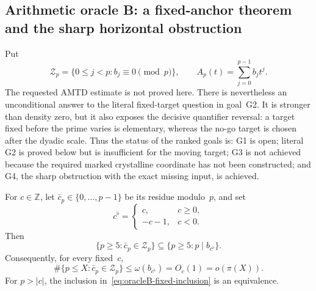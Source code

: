 
\subsection{Arithmetic oracle B: a fixed-anchor theorem and the sharp
horizontal obstruction}
\label{ssec:oracleB-result}

Put
\[
 \mathcal Z_p=\{0\leq j<p:b_j\equiv0\pmod p\},
 \qquad A_p(t)=\sum_{j=0}^{p-1}b_jt^j.
\]
The requested AMTD estimate is not proved here.  There is nevertheless an
unconditional answer to the literal fixed-target question in goal~G2.  It is
stronger than density zero, but it also exposes the decisive quantifier
reversal: a target fixed before the prime varies is elementary, whereas the
no-go target is chosen after the dyadic scale.
Thus the status of the ranked goals is: G1 is open; literal G2 is proved
below but is insufficient for the moving target; G3 is not achieved because
the required marked crystalline coordinate has not been constructed; and G4,
the sharp obstruction with the exact missing input, is achieved.

\begin{proposition}
\label{prop:oracleB-fixed-anchor}
For $c\in\mathbb Z$, let $\bar c_p\in\{0,\ldots,p-1\}$ be its residue
modulo~$p$, and set
\[
 c^\flat=\begin{cases}
 c,&c\geq0,\\
 -c-1,&c<0.
 \end{cases}
\]
Then
\begin{equation}
 \{p\geq5:\bar c_p\in\mathcal Z_p\}
 \subseteq \{p\geq5:p\mid b_{c^\flat}\}.
 \label{eq:oracleB-fixed-inclusion}
\end{equation}
Consequently, for every fixed~$c$,
\begin{equation}
 \#\{p\leq X:\bar c_p\in\mathcal Z_p\}
 \leq\omega(b_{c^\flat})=O_c(1)=o(\pi(X)).
 \label{eq:oracleB-fixed-density}
\end{equation}
For $p>|c|$, the inclusion in~\eqref{eq:oracleB-fixed-inclusion} is an
equivalence.
\end{proposition}

